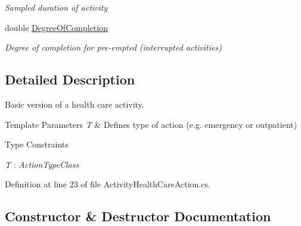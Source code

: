 \begin{DoxyCompactItemize}
\begin{DoxyCompactList}\small\item\em Sampled duration of activity \end{DoxyCompactList}\item 
double \hyperlink{class_general_health_care_elements_1_1_activities_1_1_activity_health_care_action_a496151671f4f1ba047e68d8096b2a5a5}{Degree\+Of\+Completion}
\begin{DoxyCompactList}\small\item\em Degree of completion for pre-\/empted (interrupted activities) \end{DoxyCompactList}\end{DoxyCompactItemize}


\subsection{Detailed Description}
Basic version of a health care activity. 


\begin{DoxyTemplParams}{Template Parameters}
{\em T} & Defines type of action (e.\+g. emergency or outpatient) \\
\hline
\end{DoxyTemplParams}
\begin{Desc}
\item[Type Constraints]\begin{description}
\item[{\em T} : {\em Action\+Type\+Class}]\end{description}
\end{Desc}


Definition at line 23 of file Activity\+Health\+Care\+Action.\+cs.



\subsection{Constructor \& Destructor Documentation}
